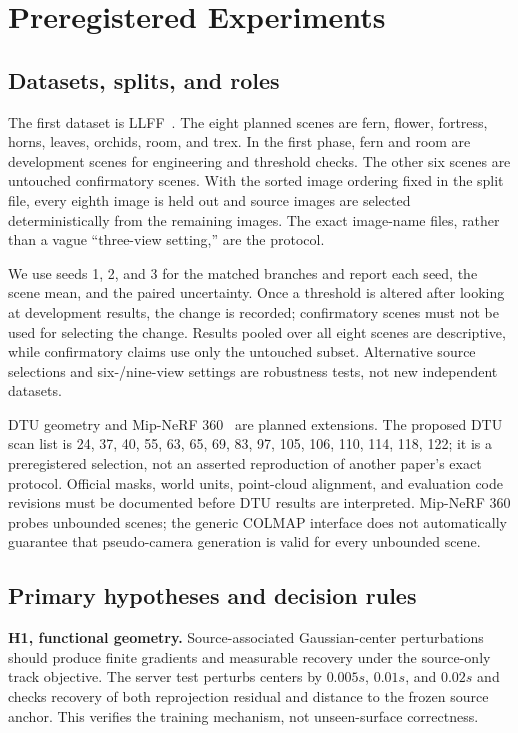 \documentclass[10pt,twocolumn,letterpaper]{article}
\begin{document}
\section{Preregistered Experiments}
\subsection{Datasets, splits, and roles}
The first dataset is LLFF~\citep{mildenhall2019llff}. The eight planned scenes are fern, flower, fortress, horns, leaves, orchids, room, and trex. In the first phase, fern and room are development scenes for engineering and threshold checks. The other six scenes are untouched confirmatory scenes. With the sorted image ordering fixed in the split file, every eighth image is held out and source images are selected deterministically from the remaining images. The exact image-name files, rather than a vague ``three-view setting,'' are the protocol.

We use seeds 1, 2, and 3 for the matched branches and report each seed, the scene mean, and the paired uncertainty. Once a threshold is altered after looking at development results, the change is recorded; confirmatory scenes must not be used for selecting the change. Results pooled over all eight scenes are descriptive, while confirmatory claims use only the untouched subset. Alternative source selections and six-/nine-view settings are robustness tests, not new independent datasets.

DTU geometry and Mip-NeRF 360~\citep{barron2022mip360} are planned extensions. The proposed DTU scan list is 24, 37, 40, 55, 63, 65, 69, 83, 97, 105, 106, 110, 114, 118, 122; it is a preregistered selection, not an asserted reproduction of another paper's exact protocol. Official masks, world units, point-cloud alignment, and evaluation code revisions must be documented before DTU results are interpreted. Mip-NeRF 360 probes unbounded scenes; the generic COLMAP interface does not automatically guarantee that pseudo-camera generation is valid for every unbounded scene.

\subsection{Primary hypotheses and decision rules}
\textbf{H1, functional geometry.} Source-associated Gaussian-center perturbations should produce finite gradients and measurable recovery under the source-only track objective. The server test perturbs centers by $0.005s$, $0.01s$, and $0.02s$ and checks recovery of both reprojection residual and distance to the frozen source anchor. This verifies the training mechanism, not unseen-surface correctness.
\end{document}
